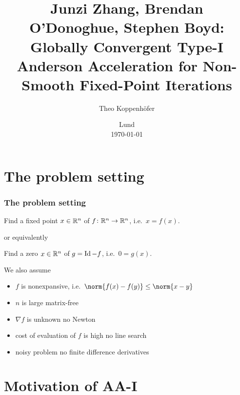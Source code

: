 %




\subject{, VT23}
\title{Junzi Zhang, Brendan O'Donoghue, Stephen Boyd: 
Globally Convergent Type-I Anderson Acceleration for Non-Smooth Fixed-Point Iterations}
\author{Theo Koppenhöfer}
\date{Lund \\[1ex] \today}











\frame[plain]{\titlepage}


\section{The problem setting}
\begin{frame}
	\frametitle{The problem setting}
	\begin{problem}
		Find a fixed point $x\in\mathbb{R}^n$ of $f\colon\mathbb{R}^n\to\mathbb{R}^n$, i.e.\ $x=f(x)$.
	\end{problem}
	or equivalently
	\begin{problem}
		Find a zero $x\in\mathbb{R}^n$ of $g=\operatorname{Id}-f$, i.e.\ $0=g(x)$.
	\end{problem}
	We also assume
	\begin{itemize}
		\item $f$ is nonexpansive, i.e.\ $\norm{f(x)-f(y)}\leq\norm{x-y}$
		\item $n$ is large \textrightarrow matrix-free
		\item $\nabla f$ is unknown \textrightarrow no Newton
		\item cost of evaluation of $f$ is high \textrightarrow no line search
		\item noisy problem \textrightarrow no finite difference derivatives
	\end{itemize}
\end{frame}

\section{Motivation of AA-I}
